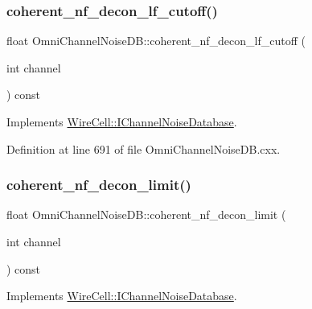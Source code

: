 \subsubsection{\texorpdfstring{coherent\+\_\+nf\+\_\+decon\+\_\+lf\+\_\+cutoff()}{coherent\_nf\_decon\_lf\_cutoff()}}
{\footnotesize\ttfamily float Omni\+Channel\+Noise\+D\+B\+::coherent\+\_\+nf\+\_\+decon\+\_\+lf\+\_\+cutoff (\begin{DoxyParamCaption}\item[{int}]{channel }\end{DoxyParamCaption}) const\hspace{0.3cm}{\ttfamily [virtual]}}



Implements \hyperlink{class_wire_cell_1_1_i_channel_noise_database_a4104509a65ce9fe5a77fac6ddd39ec56}{Wire\+Cell\+::\+I\+Channel\+Noise\+Database}.



Definition at line 691 of file Omni\+Channel\+Noise\+D\+B.\+cxx.

\mbox{\label{class_wire_cell_1_1_sig_proc_1_1_omni_channel_noise_d_b_ae062cbbc8743dd33840d92589b04821b}} 
\subsubsection{\texorpdfstring{coherent\+\_\+nf\+\_\+decon\+\_\+limit()}{coherent\_nf\_decon\_limit()}}
{\footnotesize\ttfamily float Omni\+Channel\+Noise\+D\+B\+::coherent\+\_\+nf\+\_\+decon\+\_\+limit (\begin{DoxyParamCaption}\item[{int}]{channel }\end{DoxyParamCaption}) const\hspace{0.3cm}{\ttfamily [virtual]}}



Implements \hyperlink{class_wire_cell_1_1_i_channel_noise_database_af1b0da30d4aa280deca52a84a9a6326d}{Wire\+Cell\+::\+I\+Channel\+Noise\+Database}.



